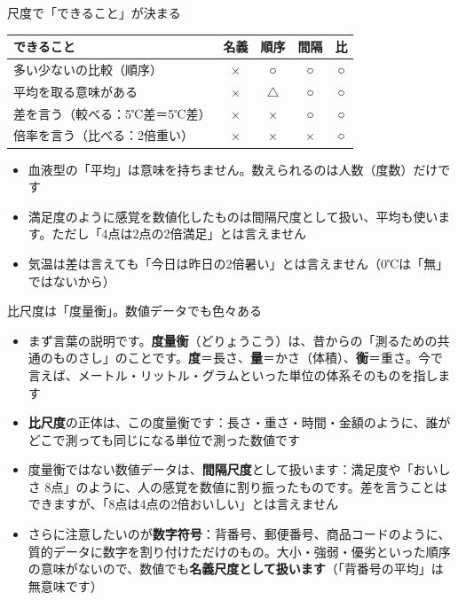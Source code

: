 \documentclass[aspectratio=169,11pt]{beamer}
\begin{document}
\begin{frame}{尺度で「できること」が決まる}
\begin{center}
\begin{tabular}{lcccc}
\toprule
できること & 名義 & 順序 & 間隔 & 比 \\
\midrule
多い少ないの比較（順序） & × & ○ & ○ & ○ \\
平均を取る意味がある & × & $\triangle$ & ○ & ○ \\
差を言う（較べる：5℃差＝5℃差） & × & × & ○ & ○ \\
倍率を言う（比べる：2倍重い） & × & × & × & ○ \\
\bottomrule
\end{tabular}
\end{center}
\begin{itemize}
\item 血液型の「平均」は意味を持ちません。数えられるのは人数（度数）だけです
\item 満足度のように感覚を数値化したものは間隔尺度として扱い、平均も使います。ただし「4点は2点の2倍満足」とは言えません
\item 気温は差は言えても「今日は昨日の2倍暑い」とは言えません（0℃は「無」ではないから）
\end{itemize}
\end{frame}

\begin{frame}{比尺度は「度量衡」。数値データでも色々ある}
\begin{itemize}
\item まず言葉の説明です。\textbf{度量衡}（どりょうこう）は、昔からの「測るための共通のものさし」のことです。\textbf{度}＝長さ、\textbf{量}＝かさ（体積）、\textbf{衡}＝重さ。今で言えば、メートル・リットル・グラムといった単位の体系そのものを指します
\item \textbf{比尺度}の正体は、この度量衡です：長さ・重さ・時間・金額のように、誰がどこで測っても同じになる単位で測った数値です
\item 度量衡ではない数値データは、\textbf{間隔尺度}として扱います：満足度や「おいしさ 8点」のように、人の感覚を数値に割り振ったものです。差を言うことはできますが、「8点は4点の2倍おいしい」とは言えません
\item さらに注意したいのが\textbf{数字符号}：背番号、郵便番号、商品コードのように、質的データに数字を割り付けただけのもの。大小・強弱・優劣といった順序の意味がないので、数値でも\textbf{名義尺度として扱います}（「背番号の平均」は無意味です）
\end{itemize}
\end{frame}
\end{document}
